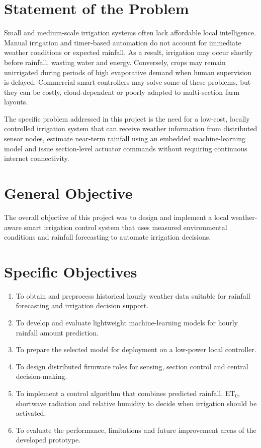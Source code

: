 \documentclass[12pt,a4paper]{report}
\begin{document}
\section{Statement of the Problem}
Small and medium-scale irrigation systems often lack affordable local intelligence. Manual irrigation and timer-based automation do not account for immediate weather conditions or expected rainfall. As a result, irrigation may occur shortly before rainfall, wasting water and energy. Conversely, crops may remain unirrigated during periods of high evaporative demand when human supervision is delayed. Commercial smart controllers may solve some of these problems, but they can be costly, cloud-dependent or poorly adapted to multi-section farm layouts.

The specific problem addressed in this project is the need for a low-cost, locally controlled irrigation system that can receive weather information from distributed sensor nodes, estimate near-term rainfall using an embedded machine-learning model and issue section-level actuator commands without requiring continuous internet connectivity.

\section{General Objective}
The overall objective of this project was to design and implement a local weather-aware smart irrigation control system that uses measured environmental conditions and rainfall forecasting to automate irrigation decisions.

\section{Specific Objectives}
\begin{enumerate}[label=(\roman*)]
	\item To obtain and preprocess historical hourly weather data suitable for rainfall forecasting and irrigation decision support.
	\item To develop and evaluate lightweight machine-learning models for hourly rainfall amount prediction.
	\item To prepare the selected model for deployment on a low-power local controller.
	\item To design distributed firmware roles for sensing, section control and central decision-making.
	\item To implement a control algorithm that combines predicted rainfall, ET$_0$, shortwave radiation and relative humidity to decide when irrigation should be activated.
	\item To evaluate the performance, limitations and future improvement areas of the developed prototype.
\end{enumerate}
\end{document}
